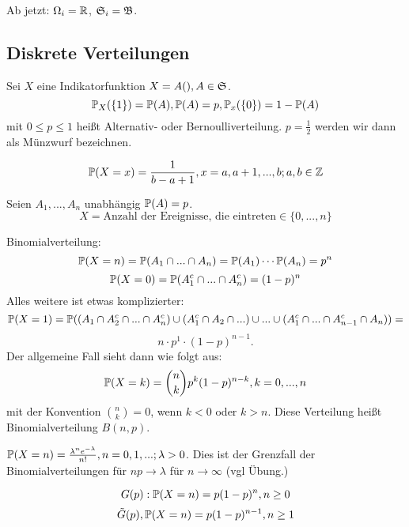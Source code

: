			\begin{bem}
				Ab jetzt: $\Omega_i=\R$, $\mf{S}_i=\mf{B}$. 
			\end{bem}
			
			\subsection{Diskrete Verteilungen}
			
				\begin{defi}
					Sei $X$ eine Indikatorfunktion $X=A(), A\in\mf{S}$. 
					\[ \P_X(\{1\})=\P(A), \P(A)=p,\P_x(\{0\})=1-\P(A) \]
					mit $0\le p\le 1$ heißt Alternativ- oder Bernoulliverteilung. $p=\frac{1}{2}$ werden wir dann als Münzwurf bezeichnen. 
				\end{defi}
				
				\begin{defi}
					
					\[ \P(X=x)=\frac{1}{b-a+1}, x=a,a+1,...,b; a,b\in\Z \]
				\end{defi}
				
				\begin{defi}[Binomialverteilung]
					Seien $A_1,...,A_n$ unabhängig $\P(A)=p$. 
					\[ X=\text{Anzahl der Ereignisse, die eintreten}\in\{0,...,n\} \]
				\end{defi}
				
				\begin{bsp}
					Binomialverteilung: 
					\[ \P(X=n)=\P(A_1\cap ...\cap A_n)=\P(A_1)\cdots\P(A_n)=p^n \]
					\[ \P(X=0)=\P(A_1^c\cap...\cap A_n^c)=(1-p)^n \]
					Alles weitere ist etwas komplizierter:
					\[ \P(X=1)=\P((A_1\cap A_2^c\cap...\cap A_n^c)\cup(A_1^c\cap A_2\cap ...)\cup...\cup(A_1^c\cap...\cap A_{n-1}^c\cap A_n))= \]
					\[ n\cdot p^1\cdot (1-p)^{n-1}. \]
					Der allgemeine Fall sieht dann wie folgt aus:
					\[ \P(X=k)=\binom{n}{k}p^k (1-p)^{n-k}, k=0,...,n \]
					mit der Konvention $\binom{n}{k}=0$, wenn $k<0$ oder $k>n$. Diese Verteilung heißt Binomialverteilung $B(n,p)$. 
				\end{bsp}
				
				\begin{defi}
					$\P(X=n)=\frac{\lambda^ne^{-\lambda}}{n!}, n=0,1,...; \lambda>0$. Dies ist der Grenzfall der Binomialverteilungen für $np\to \lambda$ für $n\to\infty$ (vgl Übung.)
				\end{defi}
				
				\begin{defi}
					\[G(p): \P(X=n)=p(1-p)^n, n\ge 0\] 
					\[\tilde{G}(p), \P(X=n)=p(1-p)^{n-1}, n\ge 1\]
				\end{defi}
				
